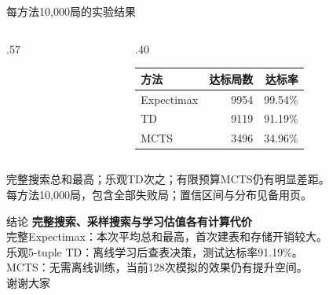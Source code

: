 \documentclass[11pt]{beamer}
\newcommand{\smalltext}{\fontsize{9pt}{12pt}\selectfont}
\begin{document}
\begin{frame}{每方法10,000局的实验结果}
\begin{columns}[T,onlytextwidth]\begin{column}{.57\textwidth}\end{column}
\begin{column}{.40\textwidth}\smalltext\vspace{7mm}
\begin{tabular}{@{}lrr@{}}\toprule 方法&达标局数&达标率\\\midrule
Expectimax&9954&99.54\%\\[2mm]
TD&9119&91.19\%\\[2mm]
MCTS&3496&34.96\%\\[2mm]
\bottomrule\end{tabular}
\end{column}\end{columns}\vspace{1mm}\smalltext
完整搜索总和最高；乐观TD次之；有限预算MCTS仍有明显差距。\\[2mm]
每方法10,000局，包含全部失败局；置信区间与分布见备用页。
\end{frame}
\begin{frame}{结论}
\textbf{完整搜索、采样搜索与学习估值各有计算代价}\\[5mm]
\smalltext 完整Expectimax：本次平均总和最高，首次建表和存储开销较大。\\[4mm]
乐观5-tuple TD：离线学习后查表决策，测试达标率91.19\%。\\[4mm]
MCTS：无需离线训练，当前128次模拟的效果仍有提升空间。\\[5mm]
\centering 谢谢大家
\end{frame}
\end{document}
